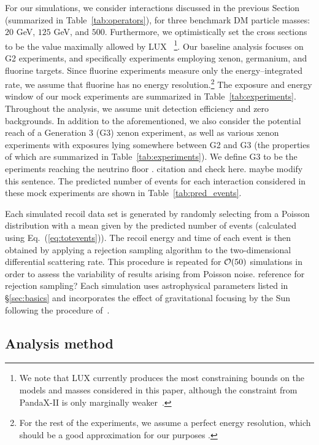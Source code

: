 \documentclass[11pt]{article}
\newcommand{\Eq}[1]{Eq.~(\ref{#1})} \newcommand{\Eqs}[2]{Eqs.~(\ref{#1}) and (\ref{#2})} \newcommand{\Eqm}[2]{Eqs.~(\ref{#1}) through (\ref{#2})}
\newcommand{\vgColor}{magenta}
\newcommand{\vg}[1]{{\color{\vgColor} #1}}
\begin{document}
For our simulations, we consider interactions discussed in the previous Section (summarized in Table~\ref{tab:operators}), for three benchmark DM particle masses: $20$ GeV, $125$ GeV, and $500$. Furthermore, we optimistically set the cross sections to be the value maximally allowed by LUX~\cite{Akerib:2016vxi} \footnote{We note that LUX currently produces the most constraining bounds on the models and masses considered in this paper, although the constraint from PandaX-II is only marginally weaker~\cite{Tan:2016zwf}.}. Our baseline analysis focuses on G2 experiments, and specifically experiments employing xenon, germanium, and fluorine targets. Since fluorine experiments measure only the energy--integrated rate, we assume that fluorine has no energy resolution.\footnote{For the rest of the experiments, we assume a perfect energy resolution, which should be a good approximation for our purposes \cite{Gluscevic:2015sqa}.}  The exposure and energy window of our mock experiments are summarized in Table~\ref{tab:experiments}. Throughout the analysis, we assume unit detection efficiency and zero backgrounds. In addition to the aforementioned, we also consider the potential reach of a Generation 3 (G3) xenon experiment, as well as various xenon experiments with exposures lying somewhere between G2 and G3 (the properties of which are summarized in Table~\ref{tab:experiments}).  We define G3 to be the eperiments reaching the neutrino floor \cite{}. \vg{citation and check here. maybe modify this sentence.} The predicted number of events for each interaction considered in these mock experiments are shown in Table~\ref{tab:pred_events}. 

Each simulated recoil data set is generated by randomly selecting from a Poisson distribution with a mean given by the predicted number of events (calculated using \Eq{eq:totevents}). The recoil energy and time of each event is then obtained by applying a rejection sampling algorithm to the two-dimensional differential scattering rate. This procedure is repeated for ${\cal O}(50)$ simulations in order to assess the variability of results arising from Poisson noise. \vg{reference for rejection sampling?} Each simulation uses astrophysical parameters listed in \S\ref{sec:basics} and incorporates the effect of gravitational focusing by the Sun following the procedure of~\cite{Lee:2013wza}. 

\subsection{Analysis method}\label{sec:stats}
\end{document}
